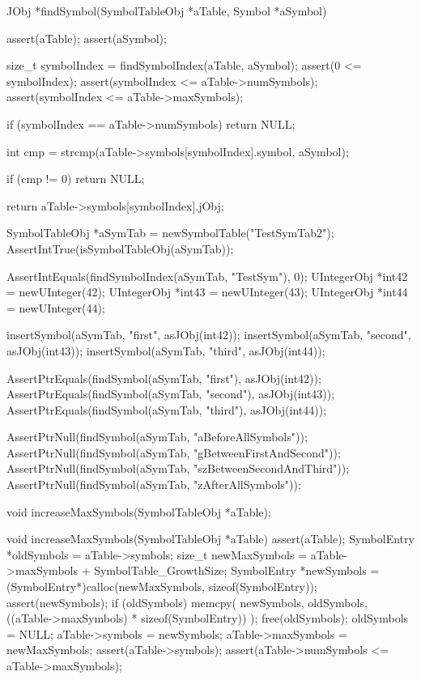 \startCCode
JObj *findSymbol(SymbolTableObj *aTable, Symbol *aSymbol) {  
  assert(aTable);
  assert(aSymbol);
  
  size_t symbolIndex = findSymbolIndex(aTable, aSymbol);
  assert(0 <= symbolIndex);
  assert(symbolIndex <= aTable->numSymbols);
  assert(symbolIndex <= aTable->maxSymbols);
    
  if (symbolIndex == aTable->numSymbols) return NULL;
  
  int cmp = strcmp(aTable->symbols[symbolIndex].symbol, aSymbol);
  
  if (cmp != 0) return NULL;
  
  return aTable->symbols[symbolIndex].jObj;
}
\stopCCode


\startCTest
  SymbolTableObj *aSymTab = newSymbolTable("TestSymTab2");
  AssertIntTrue(isSymbolTableObj(aSymTab));
  
  AssertIntEquals(findSymbolIndex(aSymTab, "TestSym"), 0);
  UIntegerObj *int42 = newUInteger(42);
  UIntegerObj *int43 = newUInteger(43);
  UIntegerObj *int44 = newUInteger(44);
  
  insertSymbol(aSymTab, "first",  asJObj(int42));
  insertSymbol(aSymTab, "second", asJObj(int43));
  insertSymbol(aSymTab, "third",  asJObj(int44));
  
  AssertPtrEquals(findSymbol(aSymTab, "first"),  asJObj(int42));
  AssertPtrEquals(findSymbol(aSymTab, "second"), asJObj(int43));
  AssertPtrEquals(findSymbol(aSymTab, "third"),  asJObj(int44));
  
  AssertPtrNull(findSymbol(aSymTab, "aBeforeAllSymbols"));
  AssertPtrNull(findSymbol(aSymTab, "gBetweenFirstAndSecond"));
  AssertPtrNull(findSymbol(aSymTab, "szBetweenSecondAndThird"));
  AssertPtrNull(findSymbol(aSymTab, "zAfterAllSymbols"));
\stopCTest
\stopTestCase
\stopTestSuite

\startTestSuite[increaseMaxSymbols]

\startCHeader
void increaseMaxSymbols(SymbolTableObj *aTable);
\stopCHeader

\startCCode
void increaseMaxSymbols(SymbolTableObj *aTable) {
  assert(aTable);
  SymbolEntry *oldSymbols = aTable->symbols;
  size_t newMaxSymbols    = aTable->maxSymbols + SymbolTable_GrowthSize;
  SymbolEntry *newSymbols =
    (SymbolEntry*)calloc(newMaxSymbols, sizeof(SymbolEntry));
  assert(newSymbols);
  if (oldSymbols) {
    memcpy(
      newSymbols,
      oldSymbols,
      ((aTable->maxSymbols) * sizeof(SymbolEntry))
    );
    free(oldSymbols);
    oldSymbols = NULL;
  }
  aTable->symbols    = newSymbols;
  aTable->maxSymbols = newMaxSymbols;
  assert(aTable->symbols);
  assert(aTable->numSymbols <= aTable->maxSymbols);
}
\stopCCode

